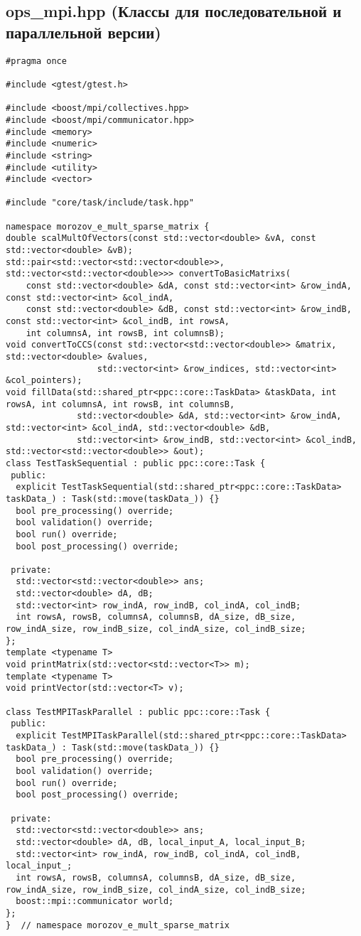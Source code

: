 \documentclass[a4paper,12pt]{article}
\begin{document}
\subsection{ops\_mpi.hpp (Классы для последовательной и параллельной версии)}
\begin{lstlisting}
#pragma once

#include <gtest/gtest.h>

#include <boost/mpi/collectives.hpp>
#include <boost/mpi/communicator.hpp>
#include <memory>
#include <numeric>
#include <string>
#include <utility>
#include <vector>

#include "core/task/include/task.hpp"

namespace morozov_e_mult_sparse_matrix {
double scalMultOfVectors(const std::vector<double> &vA, const std::vector<double> &vB);
std::pair<std::vector<std::vector<double>>, std::vector<std::vector<double>>> convertToBasicMatrixs(
    const std::vector<double> &dA, const std::vector<int> &row_indA, const std::vector<int> &col_indA,
    const std::vector<double> &dB, const std::vector<int> &row_indB, const std::vector<int> &col_indB, int rowsA,
    int columnsA, int rowsB, int columnsB);
void convertToCCS(const std::vector<std::vector<double>> &matrix, std::vector<double> &values,
                  std::vector<int> &row_indices, std::vector<int> &col_pointers);
void fillData(std::shared_ptr<ppc::core::TaskData> &taskData, int rowsA, int columnsA, int rowsB, int columnsB,
              std::vector<double> &dA, std::vector<int> &row_indA, std::vector<int> &col_indA, std::vector<double> &dB,
              std::vector<int> &row_indB, std::vector<int> &col_indB, std::vector<std::vector<double>> &out);
class TestTaskSequential : public ppc::core::Task {
 public:
  explicit TestTaskSequential(std::shared_ptr<ppc::core::TaskData> taskData_) : Task(std::move(taskData_)) {}
  bool pre_processing() override;
  bool validation() override;
  bool run() override;
  bool post_processing() override;

 private:
  std::vector<std::vector<double>> ans;
  std::vector<double> dA, dB;
  std::vector<int> row_indA, row_indB, col_indA, col_indB;
  int rowsA, rowsB, columnsA, columnsB, dA_size, dB_size, row_indA_size, row_indB_size, col_indA_size, col_indB_size;
};
template <typename T>
void printMatrix(std::vector<std::vector<T>> m);
template <typename T>
void printVector(std::vector<T> v);

class TestMPITaskParallel : public ppc::core::Task {
 public:
  explicit TestMPITaskParallel(std::shared_ptr<ppc::core::TaskData> taskData_) : Task(std::move(taskData_)) {}
  bool pre_processing() override;
  bool validation() override;
  bool run() override;
  bool post_processing() override;

 private:
  std::vector<std::vector<double>> ans;
  std::vector<double> dA, dB, local_input_A, local_input_B;
  std::vector<int> row_indA, row_indB, col_indA, col_indB, local_input_;
  int rowsA, rowsB, columnsA, columnsB, dA_size, dB_size, row_indA_size, row_indB_size, col_indA_size, col_indB_size;
  boost::mpi::communicator world;
};
}  // namespace morozov_e_mult_sparse_matrix

\end{lstlisting}
\end{document}
